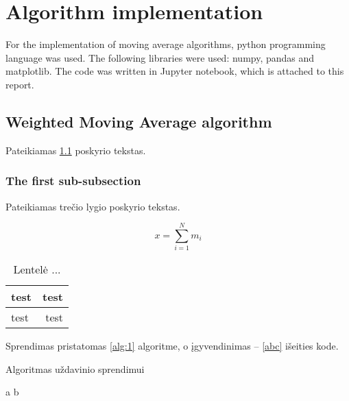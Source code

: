 \documentclass[a4paper,12pt,fleqn]{article}
\begin{document}

\tableofcontents


\newpage
\abstract{}%
\newpage
\section{Algorithm implementation}\label{sec:motivation}

For the implementation of moving average algorithms, python programming language was used. The following libraries were used: numpy, pandas and matplotlib. The code was written in Jupyter notebook, which is attached to this report.
\subsection{Weighted Moving Average algorithm}\label{sec:example}
Pateikiamas \ref{sec:example} poskyrio tekstas. 


 
\subsubsection{The first sub-subsection}\label{sec:data}
Pateikiamas trečio lygio poskyrio tekstas.

\begin{equation}
x = \sum_{i=1}^N m_i
\end{equation}

\begin{table}[!ht]\centering
\caption{Lentelė ... }
\label{tabl:table}
\begin{tabular}{|l|r|}\hline
test & test\\ \hline\hline
test & test\\\hline
\end{tabular}
\end{table}

Sprendimas pristatomas \ref{alg:1} algoritme, o įgyvendinimas -- \ref{abc} išeities kode.

\begin{algorithm}\caption{Algoritmas uždavinio sprendimui}
  \label{alg:1}
  \begin{algorithmic}
    \REQUIRE 
    \ENSURE 
\STATE a \AND b
\end{algorithmic}


\end{algorithm}
\end{document}
